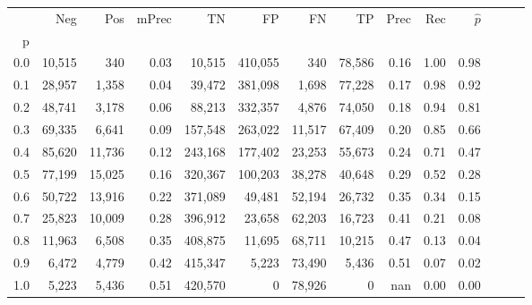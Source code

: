 \begin{tabular}{rrrrrrrrrrrrrr}
\toprule
{} &     Neg &     Pos & mPrec &       TN &       FP &      FN &      TP &  Prec &   Rec & $\hat{p}$ \\
p   &         &         &       &          &          &         &         &       &       &           \\
\midrule
0.0 &  10,515 &     340 &  0.03 &   10,515 &  410,055 &     340 &  78,586 &  0.16 &  1.00 &      0.98 \\
0.1 &  28,957 &   1,358 &  0.04 &   39,472 &  381,098 &   1,698 &  77,228 &  0.17 &  0.98 &      0.92 \\
0.2 &  48,741 &   3,178 &  0.06 &   88,213 &  332,357 &   4,876 &  74,050 &  0.18 &  0.94 &      0.81 \\
0.3 &  69,335 &   6,641 &  0.09 &  157,548 &  263,022 &  11,517 &  67,409 &  0.20 &  0.85 &      0.66 \\
0.4 &  85,620 &  11,736 &  0.12 &  243,168 &  177,402 &  23,253 &  55,673 &  0.24 &  0.71 &      0.47 \\
0.5 &  77,199 &  15,025 &  0.16 &  320,367 &  100,203 &  38,278 &  40,648 &  0.29 &  0.52 &      0.28 \\
0.6 &  50,722 &  13,916 &  0.22 &  371,089 &   49,481 &  52,194 &  26,732 &  0.35 &  0.34 &      0.15 \\
0.7 &  25,823 &  10,009 &  0.28 &  396,912 &   23,658 &  62,203 &  16,723 &  0.41 &  0.21 &      0.08 \\
0.8 &  11,963 &   6,508 &  0.35 &  408,875 &   11,695 &  68,711 &  10,215 &  0.47 &  0.13 &      0.04 \\
0.9 &   6,472 &   4,779 &  0.42 &  415,347 &    5,223 &  73,490 &   5,436 &  0.51 &  0.07 &      0.02 \\
1.0 &   5,223 &   5,436 &  0.51 &  420,570 &        0 &  78,926 &       0 &   nan &  0.00 &      0.00 \\
\bottomrule
\end{tabular}
